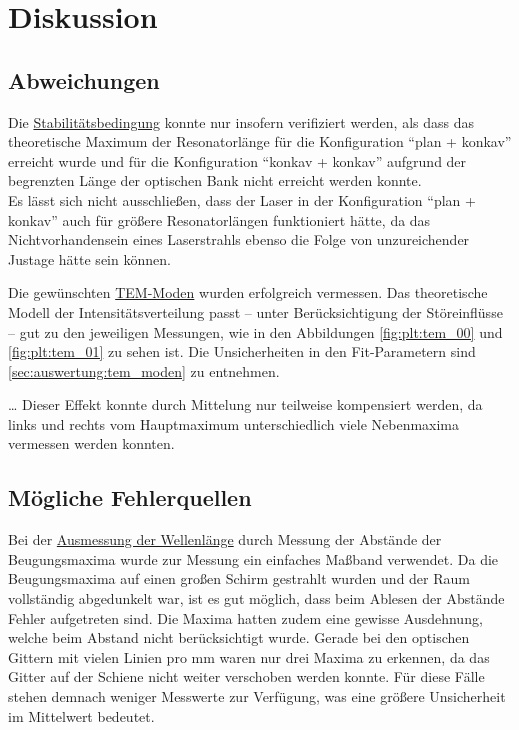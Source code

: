 \section{Diskussion}
\label{sec:diskussion}

\subsection{Abweichungen}
    Die \hyperref[sec:auswertung:stabilitaetsbedingung]{Stabilitätsbedingung} konnte nur insofern verifiziert werden,
    als dass das theoretische Maximum der Resonatorlänge
    für die Konfiguration \enquote{plan + konkav} erreicht wurde
    und für die Konfiguration \enquote{konkav + konkav} aufgrund der begrenzten Länge der optischen Bank nicht erreicht werden konnte.\\
    Es lässt sich nicht ausschließen,
    dass der Laser in der Konfiguration \enquote{plan + konkav} auch für größere Resonatorlängen funktioniert hätte,
    da das Nichtvorhandensein eines Laserstrahls ebenso die Folge von unzureichender Justage hätte sein können.

    Die gewünschten \hyperref[sec:auswertung:tem_moden]{TEM-Moden} wurden erfolgreich vermessen.
    Das theoretische Modell der Intensitätsverteilung passt
    – unter Berücksichtigung der Störeinflüsse –
    gut zu den jeweiligen Messungen,
    wie in den Abbildungen \ref{fig:plt:tem_00} und \ref{fig:plt:tem_01} zu sehen ist.
    Die Unsicherheiten in den Fit-Parametern sind \autoref{sec:auswertung:tem_moden} zu entnehmen.






    …
    Dieser Effekt konnte durch Mittelung nur teilweise kompensiert werden,
    da links und rechts vom Hauptmaximum unterschiedlich viele Nebenmaxima vermessen werden konnten.



\subsection{Mögliche Fehlerquellen}
    Bei der \hyperref[sec:auswertung:wellenlaenge]{Ausmessung der Wellenlänge} durch Messung der Abstände der Beugungsmaxima wurde zur Messung ein einfaches Maßband verwendet.
    Da die Beugungsmaxima auf einen großen Schirm gestrahlt wurden und der Raum vollständig abgedunkelt war,
    ist es gut möglich,
    dass beim Ablesen der Abstände Fehler aufgetreten sind.
    Die Maxima hatten zudem eine gewisse Ausdehnung,
    welche beim Abstand nicht berücksichtigt wurde.
    Gerade bei den optischen Gittern mit vielen Linien pro \si{\milli\meter} waren nur drei Maxima zu erkennen,
    da das Gitter auf der Schiene nicht weiter verschoben werden konnte.
    Für diese Fälle stehen demnach weniger Messwerte zur Verfügung,
    was eine größere Unsicherheit im Mittelwert bedeutet.


